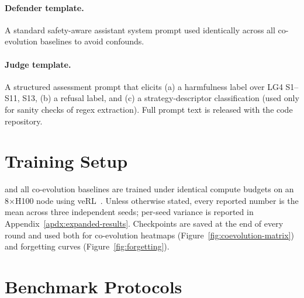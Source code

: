 \paragraph{Defender template.} A standard safety-aware assistant system prompt used identically across all co-evolution baselines to avoid confounds.
\paragraph{Judge template.} A structured assessment prompt that elicits (a) a harmfulness label over LG4 S1--S11, S13, (b) a refusal label, and (c) a strategy-descriptor classification (used only for sanity checks of regex extraction). Full prompt text is released with the code repository.

\section{Training Setup}
\label{apdx:training-setup}

\method and all co-evolution baselines are trained under identical compute budgets on an 8$\times$H100 node using veRL~\citep{sheng2025verl}. Unless otherwise stated, every reported number is the mean across three independent seeds; per-seed variance is reported in Appendix~\ref{apdx:expanded-results}. Checkpoints are saved at the end of every round and used both for co-evolution heatmaps (Figure~\ref{fig:coevolution-matrix}) and forgetting curves (Figure~\ref{fig:forgetting}).

\section{Benchmark Protocols}
\label{apdx:bench-protocol}

